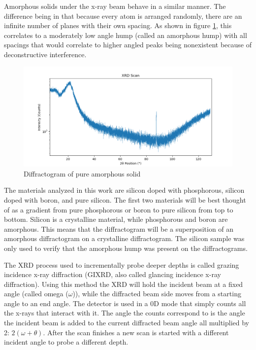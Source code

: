 \documentclass{article}
\begin{document}
\begin{multicols}{2}
    Amorphous solids under the x-ray beam behave in a similar manner. 
    The difference being in that because every atom is arranged randomly, there are an infinite number of planes with their own spacing. 
    As shown in figure \ref{fig:pure amorphous XRD scan}, this correlates to a moderately low angle hump (called an amorphous hump) with all spacings that would correlate to higher angled peaks being nonexistent because of deconstructive interference.

\begin{figure}[H]
    \centering
    \includegraphics[width=1\linewidth]{amorphous XRD scan.png}
    \caption{Diffractogram of pure amorphous solid}
    \label{fig:pure amorphous XRD scan}
\end{figure}

    The materials analyzed in this work are silicon doped with phosphorous, silicon doped with boron, and pure silicon. 
    The first two materials will be best thought of as a gradient from pure phosphorous or boron to pure silicon from top to bottom. 
    Silicon is a crystalline material, while phosphorous and boron are amorphous. 
    This means that the diffractogram will be a superposition of an amorphous diffractogram on a crystalline diffractogram. 
    The silicon sample was only used to verify that the amorphous hump was present on the diffractograms.

    The XRD process used to incrementally probe deeper depths is called grazing incidence x-ray diffraction (GIXRD, also called glancing incidence x-ray diffraction). 
    Using this method the XRD will hold the incident beam at a fixed angle (called omega ($\omega$)), while the diffracted beam side moves from a starting angle to an end angle. 
    The detector is used in a 0D mode that simply counts all the x-rays that interact with it. 
    The angle the counts correspond to is the angle the incident beam is added to the current diffracted beam angle all multiplied by 2: $2(\omega+\theta)$. 
    After the scan finishes a new scan is started with a different incident angle to probe a different depth.


\end{multicols}
\end{document}
